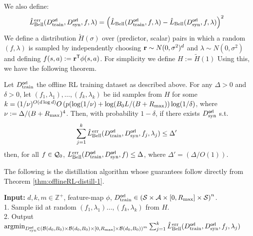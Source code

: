 We also define:
\begin{equation}
    \hat{L}^{\textnormal{err}}_{\textnormal{Bell}}(D^{\sf orl}_{\textnormal{train}}, D^{\sf orl}_{\textnormal{syn}}, f, \lambda) = \left(\hat{L}_{\textnormal{Bell}}(D^{\sf orl}_{\textnormal{train}}, f, \lambda) - \hat{L}_{\textnormal{Bell}}(D^{\sf orl}_{\textnormal{syn}}, f, \lambda)\right)^2 \label{eqn:haterrBell}
\end{equation}
We define a distribution $\tilde{H}(\sigma)$ over (predictor, scalar) pairs in which a random $(f, \lambda)$ is sampled by independently choosing ${\mathbf{r}} \sim N(0,\sigma^2)^d$ and $\lambda \sim N(0,\sigma^2)$ and defining $f(s,a) := {\mathbf{r}}^{\sf T}\phi(s,a)$. For simplicity we define $H := \tilde{H}(1)$ Using this, we have the following theorem.
\begin{theorem}\label{thm:offlineRL-distill-1}
    Let $D^{\sf orl}_{\textnormal{train}}$ the offline RL training dataset as described above. For any $\Delta > 0$ and $\delta > 0$, let $(f_1, \lambda_1), \dots, (f_k, \lambda_k)$  be iid samples from  $H$ for some $k = (1/\nu)^{O(d\log d)}O\left(p(\log(1/\nu) + \log(B_0L/(B+R_{\textnormal{max}})\right)\log(1/\delta)$, where $\nu := \Delta/(B+R_{\textnormal{max}})^4$. Then, with probability $1-\delta$, if there exists $D^{\sf orl}_{\textnormal{syn}}$ s.t. 
\begin{equation}
    \sum_{j = 1}^{k} \hat{L}^{\textnormal{err}}_{\textnormal{Bell}}(D^{\sf orl}_{\textnormal{train}}, D^{\sf orl}_{\textnormal{syn}}, f_j, \lambda_j) \leq \Delta' \label{eqn:erronsampledregsorl}
\end{equation}
then, for all $f \in \mathcal{Q}_0$, $L^{\textnormal{err}}_{\textnormal{Bell}}(D^{\sf orl}_{\textnormal{train}}, D^{\sf orl}_{\textnormal{syn}}, f) \leq \Delta$, where $\Delta' = (\Delta/O(1))$. 
\end{theorem}

The following is the distillation algorithm whose guarantees follow directly from Theorem \ref{thm:offlineRL-distill-1}. 
\begin{algorithm}
\caption{Offline RL Dataset Distillation}\label{alg:two}
{\bf Input:}  $d, k, m \in \mathbb{Z}^+$, feature-map $\phi$, $D^{\sf orl}_{\textnormal{train}} \in \left(\mathcal{S}\times\mathcal{A}\times [0, R_{\textnormal{max}}]\times \mathcal{S}\right)^n$.\\
1. Sample iid at random $(f_1, \lambda_1) \dots, (f_k, \lambda_k)$ from $H$.\\
2. Output \ \ \ $\textnormal{argmin}_{D^{\sf orl}_{\textnormal{syn}} \in  \left(\mathcal{B}(d_0, B_0) \times \mathcal{B}(d_0, B_0)\times [0, R_{\textnormal{max}}] \times \mathcal{B}(d_0, B_0)\right)^m} \sum_{j = 1}^{k} \hat{L}^{\textnormal{err}}_{\textnormal{Bell}}(D^{\sf orl}_{\textnormal{train}}, D^{\sf orl}_{\textnormal{syn}}, f_j, \lambda_j)$
\end{algorithm}

